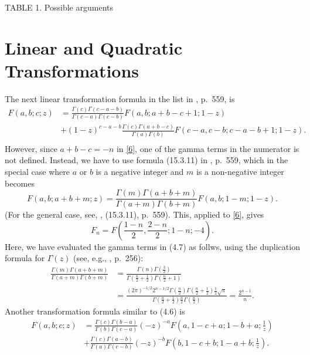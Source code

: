\documentclass[11pt,reqno]{amsart}
\theoremstyle{plain}
\numberwithin{equation}{section}
\begin{document}
\begin{center}
TABLE 1. Possible arguments
\end{center}

\section{Linear and Quadratic Transformations}

The next linear transformation formula in the list in \cite{abram},
p.~559, is
\begin{equation}
\begin{split}
F(a, b; c; z) &= \frac{\Gamma (c) \Gamma (c-a-b)}{\Gamma (c-a) \Gamma (c-b)} F(a, b; a+b-c+1; 1-z) \\
&+ (1-z)^{c-a-b} \frac{\Gamma (c) \Gamma (a+b-c)}{\Gamma (a) \Gamma (b)} F(c-a, c-b; c-a-b+1; 1-z). \\
\end{split}
\end{equation}
However, since $a+b-c = -n$ in \eqref{6}, one of the gamma terms in
the numerator is not defined.  Instead, we have to use formula
(15.3.11) in \cite{abram}, p.~559, which in the special case where
$a$ or $b$ is a negative integer and $m$ is a non-negative integer
becomes
\begin{equation}\label{8}
F(a, b; a+b+m; z) = \frac{\Gamma (m) \Gamma (a+b+m)}{\Gamma (a+m)
\Gamma (b+m)} F(a, b; 1-m; 1-z) .
\end{equation}
(For the general case, see, \cite{abram}, (15.3.11), p.~559).  This,
applied to \eqref{6}, gives
\begin{equation}\label{9}
F_n = F \left( \frac{1-n}{2}, \frac{2-n}{2}; 1-n; -4 \right) .
\end{equation}
Here, we have evaluated the gamma terms in (4.7) as follws, using
the duplication formula for $\Gamma (z)$ (see, e.g., \cite{abram},
p.~256):
\[
\begin{split}
\frac{\Gamma (m) \Gamma (a+b+m)}{\Gamma (a+m) \Gamma (b+m)} &= \frac{\Gamma (n)
\Gamma (\frac{3}{2})}{\Gamma (\frac{n}{2} + \frac{1}{2}) \Gamma (\frac{n}{2} + 1)} \\
&= \frac{(2\pi)^{-1/2} 2^{n-1/2} \Gamma (\frac{n}{2}) \Gamma
(\frac{n}{2} + \frac{1}{2}) \frac{1}{2} \sqrt \pi}{\Gamma
(\frac{n}{2} + \frac{1}{2}) \frac{n}{2} \Gamma (\frac{n}{2})} =
\frac{2^{n-1}}{n} .
\end{split}
\]
Another transformation formula similar to (4.6) is
\begin{equation}\label{10}
\begin{split}
F(a, b; c; z) &= \frac{\Gamma (c) \Gamma (b-a)}{\Gamma (b) \Gamma (c-a)} (-z)^{-a} F \left( a, 1-c+a; 1-b+a; \frac{1}{z} \right) \\
&+ \frac{\Gamma (c) \Gamma (a-b)}{\Gamma (a) \Gamma (c-b)} (-z)^{-b}
F \left( b, 1-c+b; 1-a+b; \frac{1}{z} \right) .
\end{split}
\end{equation}
\end{document}
